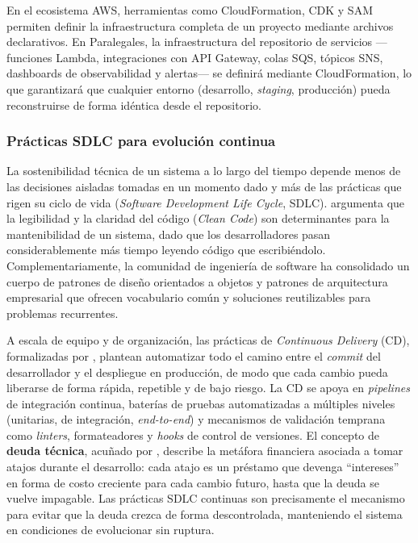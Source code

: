 En el ecosistema AWS, herramientas como CloudFormation, CDK y SAM permiten definir la infraestructura completa de un proyecto mediante archivos declarativos. En Paralegales, la infraestructura del repositorio de servicios —funciones Lambda, integraciones con API Gateway, colas SQS, tópicos SNS, dashboards de observabilidad y alertas— se definirá mediante CloudFormation, lo que garantizará que cualquier entorno (desarrollo, \textit{staging}, producción) pueda reconstruirse de forma idéntica desde el repositorio.

\subsubsection{Prácticas SDLC para evolución continua}

La sostenibilidad técnica de un sistema a lo largo del tiempo depende menos de las decisiones aisladas tomadas en un momento dado y más de las prácticas que rigen su ciclo de vida (\textit{Software Development Life Cycle}, SDLC). \textcite{Martin2008} argumenta que la legibilidad y la claridad del código (\textit{Clean Code}) son determinantes para la mantenibilidad de un sistema, dado que los desarrolladores pasan considerablemente más tiempo leyendo código que escribiéndolo. Complementariamente, la comunidad de ingeniería de software ha consolidado un cuerpo de patrones de diseño orientados a objetos \cite{Gamma1994} y patrones de arquitectura empresarial \cite{Fowler2002} que ofrecen vocabulario común y soluciones reutilizables para problemas recurrentes.

A escala de equipo y de organización, las prácticas de \textit{Continuous Delivery} (CD), formalizadas por \textcite{Humble2010}, plantean automatizar todo el camino entre el \textit{commit} del desarrollador y el despliegue en producción, de modo que cada cambio pueda liberarse de forma rápida, repetible y de bajo riesgo. La CD se apoya en \textit{pipelines} de integración continua, baterías de pruebas automatizadas a múltiples niveles (unitarias, de integración, \textit{end-to-end}) y mecanismos de validación temprana como \textit{linters}, formateadores y \textit{hooks} de control de versiones. El concepto de \textbf{deuda técnica}, acuñado por \textcite{Cunningham1992}, describe la metáfora financiera asociada a tomar atajos durante el desarrollo: cada atajo es un préstamo que devenga ``intereses'' en forma de costo creciente para cada cambio futuro, hasta que la deuda se vuelve impagable. Las prácticas SDLC continuas son precisamente el mecanismo para evitar que la deuda crezca de forma descontrolada, manteniendo el sistema en condiciones de evolucionar sin ruptura.
